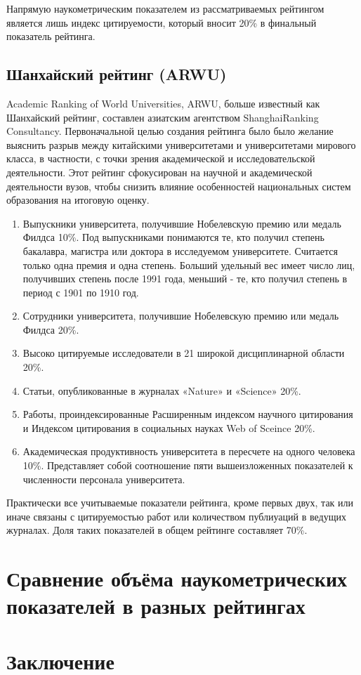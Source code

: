 Напрямую наукометрическим показателем из рассматриваемых рейтингом является лишь
индекс цитируемости, который вносит 20\% в финальный показатель рейтинга.

\subsection{Шанхайский рейтинг (ARWU)}

Academic Ranking of World Universities, ARWU, больше известный как Шанхайский рейтинг,
составлен азиатским агентством ShanghaiRanking Consultancy.
Первоначальной целью создания рейтинга было было желание выяснить разрыв
между китайскими университетами и университетами мирового класса, в частности,
с точки зрения академической и исследовательской деятельности.
Этот рейтинг сфокусирован на научной и академической деятельности вузов,
чтобы снизить влияние особенностей национальных систем образования на итоговую оценку.

\begin{enumerate}
  \item Выпускники университета, получившие Нобелевскую премию или медаль Филдса 10\%.
  Под выпускниками понимаются те, кто получил степень бакалавра, магистра или доктора
  в исследуемом университете. Считается только одна премия и одна степень.
  Больший удельный вес имеет число лиц, получивших степень после 1991 года,
  меньший - те, кто получил степень в период с 1901 по 1910 год.
  \item Сотрудники университета, получившие Нобелевскую премию или медаль Филдса 20\%.
  \item Высоко цитируемые исследователи в 21 широкой дисциплинарной области 20\%.
  \item Статьи, опубликованные в журналах «Nature» и «Science» 20\%.
  \item Работы, проиндексированные Расширенным индексом научного цитирования и
  Индексом цитирования в социальных науках Web of Sceince 20\%.
  \item Академическая продуктивность университета в пересчете на одного человека 10\%.
  Представляет собой соотношение пяти вышеизложенных показателей к численности персонала университета.
\end{enumerate}

Практически все учитываемые показатели рейтинга, кроме первых двух, так или иначе
связаны с цитируемостью работ или количеством публиуаций в ведущих журналах.
Доля таких показателей в общем рейтинге составляет 70\%.

\section{Сравнение объёма наукометрических показателей в разных рейтингах}
\section{Заключение}
